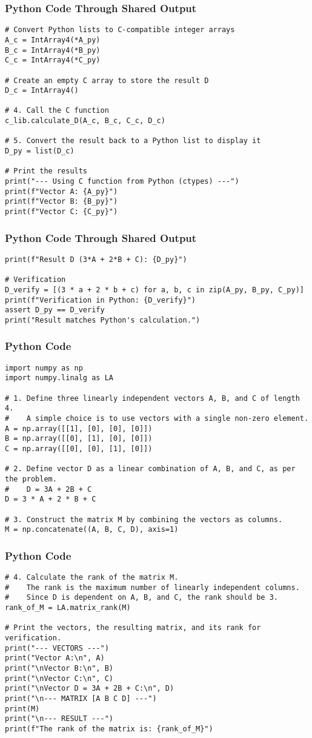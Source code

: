 \documentclass{beamer}
\begin{document}
\begin{frame}[fragile]
\frametitle{Python Code Through Shared Output}
\begin{lstlisting}
# Convert Python lists to C-compatible integer arrays
A_c = IntArray4(*A_py)
B_c = IntArray4(*B_py)
C_c = IntArray4(*C_py)

# Create an empty C array to store the result D
D_c = IntArray4()

# 4. Call the C function
c_lib.calculate_D(A_c, B_c, C_c, D_c)

# 5. Convert the result back to a Python list to display it
D_py = list(D_c)

# Print the results
print("--- Using C function from Python (ctypes) ---")
print(f"Vector A: {A_py}")
print(f"Vector B: {B_py}")
print(f"Vector C: {C_py}")
\end{lstlisting}
\end{frame}
\begin{frame}[fragile]
\frametitle{Python Code Through Shared Output}
\begin{lstlisting}
print(f"Result D (3*A + 2*B + C): {D_py}")

# Verification
D_verify = [(3 * a + 2 * b + c) for a, b, c in zip(A_py, B_py, C_py)]
print(f"Verification in Python: {D_verify}")
assert D_py == D_verify
print("Result matches Python's calculation.")
\end{lstlisting}
\end{frame}
\begin{frame}[fragile]
\frametitle{Python Code}
\begin{lstlisting}
import numpy as np
import numpy.linalg as LA

# 1. Define three linearly independent vectors A, B, and C of length 4.
#    A simple choice is to use vectors with a single non-zero element.
A = np.array([[1], [0], [0], [0]])
B = np.array([[0], [1], [0], [0]])
C = np.array([[0], [0], [1], [0]])

# 2. Define vector D as a linear combination of A, B, and C, as per the problem.
#    D = 3A + 2B + C
D = 3 * A + 2 * B + C

# 3. Construct the matrix M by combining the vectors as columns.
M = np.concatenate((A, B, C, D), axis=1)
\end{lstlisting}
\end{frame}
\begin{frame}[fragile]
\frametitle{Python Code}
\begin{lstlisting}
# 4. Calculate the rank of the matrix M.
#    The rank is the maximum number of linearly independent columns.
#    Since D is dependent on A, B, and C, the rank should be 3.
rank_of_M = LA.matrix_rank(M)

# Print the vectors, the resulting matrix, and its rank for verification.
print("--- VECTORS ---")
print("Vector A:\n", A)
print("\nVector B:\n", B)
print("\nVector C:\n", C)
print("\nVector D = 3A + 2B + C:\n", D)
print("\n--- MATRIX [A B C D] ---")
print(M)
print("\n--- RESULT ---")
print(f"The rank of the matrix is: {rank_of_M}")
\end{lstlisting}
\end{frame}
\end{document}
